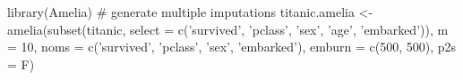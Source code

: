 \begin{Schunk}
\begin{Sinput}
 library(Amelia) # generate multiple imputations 
 titanic.amelia <- amelia(subset(titanic, select = c('survived', 'pclass', 'sex', 'age', 'embarked')), m = 10,  noms = c('survived', 'pclass', 'sex', 'embarked'), 
  emburn = c(500, 500), p2s = F)
\end{Sinput}
\end{Schunk}
